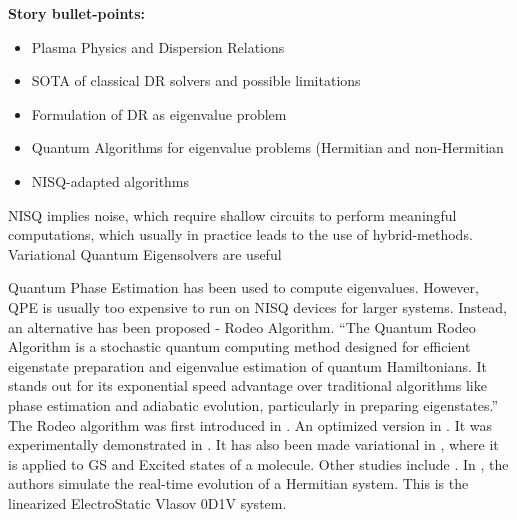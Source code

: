 \documentclass[12pt]{iopart}
\begin{document}
\textbf{Story bullet-points:}
\begin{itemize}
    \item Plasma Physics and Dispersion Relations
    \item SOTA of classical DR solvers and possible limitations
    \item Formulation of DR as eigenvalue problem 
    \item Quantum Algorithms for eigenvalue problems (Hermitian and non-Hermitian
    \item NISQ-adapted algorithms
\end{itemize}

NISQ implies noise, which require shallow circuits to perform meaningful computations, which usually in practice leads to the use of hybrid-methods.
Variational Quantum Eigensolvers are useful \cite{tillyVariationalQuantumEigensolver2022,fedorovVQEMethodShort2022}


Quantum Phase Estimation has been used to compute eigenvalues.
\cite{shaoComputingEigenvaluesDiagonalizable2022}
However, QPE is usually too expensive to run on NISQ devices for larger systems. Instead, an alternative has been proposed - Rodeo Algorithm.
%
``The Quantum Rodeo Algorithm is a stochastic quantum computing method designed for efficient eigenstate preparation and eigenvalue estimation of quantum Hamiltonians. It stands out for its exponential speed advantage over traditional algorithms like phase estimation and adiabatic evolution, particularly in preparing eigenstates.''
%
The Rodeo algorithm was first introduced in \cite{choiRodeoAlgorithmQuantum2021}. An optimized version in \cite{cohenOptimizingRodeoProjection2023}.
%
It was experimentally demonstrated in \cite{qianDemonstrationRodeoAlgorithm2024}. 
%
It has also been made variational in \cite{zhuEfficientQuantumEstimation2025}, where it is applied to GS and Excited states of a molecule.
%
Other studies include \cite{rochaEstimatingNumberStates2024,gomesUnravelingRodeoAlgorithm2025}.
In \cite{engelQuantumAlgorithmVlasov2019}, the authors simulate the real-time evolution of a Hermitian system. This is the linearized ElectroStatic Vlasov 0D1V system.
\end{document}
